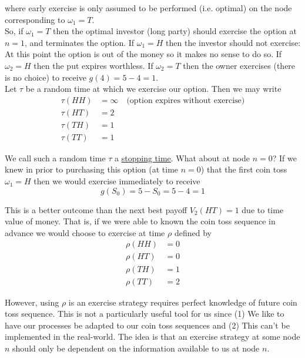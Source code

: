 \documentclass[12pt]{article}
\newlength\tindent
\renewcommand{\indent}{\hspace*{\tindent}}
\begin{document}
where early exercise is only assumed to be performed (i.e. optimal) on the node corresponding to $\omega_1 = T$. \\

\indent So, if $\omega_1 = T$ then the optimal investor (long party) should exercise the option at $n = 1$, and terminates the option. If $\omega_1 = H$ then the investor should not exercise: At this point the option is out of the money so it makes no sense to do so. If $\omega_2 = H$ then the put expires worthless. If $\omega_2 = T$ then the owner exercises (there is no choice) to receive $g(4) = 5 - 4 = 1$. \\

Let $\tau$ be a random time at which we exercise our option. Then we may write
\begin{align*}
	\tau(HH) &= \infty \quad \text{(option expires without exercise)} \\
	\tau(HT) &= 2 \\
	\tau(TH) &= 1 \\
	\tau(TT) &= 1
\end{align*}

\indent We call such a random time $\tau$ a \underline{stopping time}. What about at node $n = 0$? If we knew in prior to purchasing this option (at time $n = 0$) that the first coin toss $\omega_1 = H$ then we would exercise immediately to receive
\begin{equation*}
	g(S_0) = 5 - S_0 = 5 - 4 = 1
\end{equation*}

\indent This is a better outcome than the next best payoff $V_2(HT) = 1$ due to time value of money. That is, if we were able to known the coin toss sequence in advance we would choose to exercise at time $\rho$ defined by
\begin{align*}
	\rho(HH) &= 0 \\
	\rho(HT) &= 0 \\
	\rho(TH) &= 1 \\
	\rho(TT) &= 2
\end{align*}

\indent However, using $\rho$ is an exercise strategy requires perfect knowledge of future coin toss sequence. This is not a particularly useful tool for us since (1) We like to have our processes be adapted to our coin toss sequences and (2) This can't be implemented in the real-world. The idea is that an exercise strategy at some node $n$ should only be dependent on the information available to us at node $n$. \\
\end{document}
